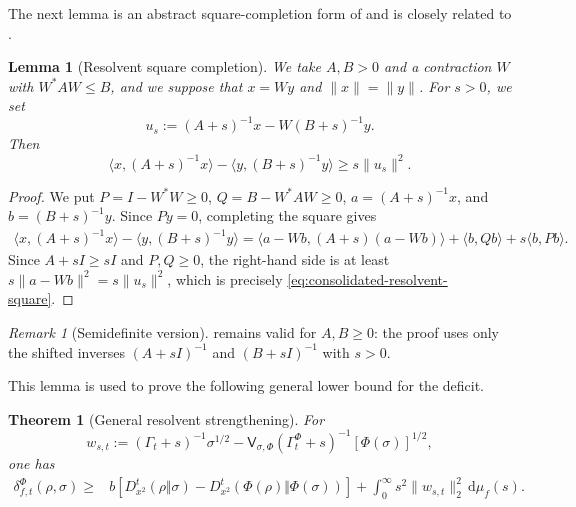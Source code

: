 \documentclass[11pt]{article}
\newtheorem{theorem}[theorem]{Theorem}
\newtheorem{lemma}[lemma]{Lemma}
\theoremstyle{remark}
\newtheorem{remark}[remark]{Remark}
\newcommand{\1}{\mathbbm{1}}
\begin{document}
The next lemma is an abstract square-completion form of
\cite[Lemma~2.1]{carlen2020recovery-map} and is closely related to
\cite[Lemma~5.1]{bluhm2020strengthened}.

\begin{lemma}[Resolvent square completion]
\label{lem:consolidated-resolvent}
We take $A,B>0$ and a contraction $W$ with $W^*AW\leq B$,
and we suppose that $x=Wy$ and
$\lVert x\rVert=\lVert y\rVert$.  For $s>0$, we set
\begin{equation}
 u_s:=(A+s)^{-1}x-W(B+s)^{-1}y.
\end{equation}
Then
\begin{equation}
 \langle x,(A+s)^{-1}x\rangle
 -\langle y,(B+s)^{-1}y\rangle
 \geq s\lVert u_s\rVert^2.
 \label{eq:consolidated-resolvent-square}
\end{equation}
\end{lemma}

\begin{proof}
We put $P=I-W^*W\geq0$, $Q=B-W^*AW\geq0$,
$a=(A+s)^{-1}x$, and $b=(B+s)^{-1}y$.  Since
$Py=0$, completing the square gives
\begin{align*}
 \langle x,(A+s)^{-1}x\rangle
 -\langle y,(B+s)^{-1}y\rangle=
 \langle a-Wb,(A+s)(a-Wb)\rangle
 +\langle b,Qb\rangle+s\langle b,Pb\rangle.
\end{align*}
Since $A+sI\geq sI$ and $P,Q\geq0$, the right-hand side is at least
$s\lVert a-Wb\rVert^2=s\lVert u_s\rVert^2$, which is precisely
\eqref{eq:consolidated-resolvent-square}.
\end{proof}

\begin{remark}[Semidefinite version]
 remains valid for $A,B\geq0$:
the proof uses only the shifted inverses $(A+sI)^{-1}$ and
$(B+sI)^{-1}$ with $s>0$.
\end{remark}

This lemma is used to prove the following general lower bound for the deficit. 

\begin{theorem}[General resolvent strengthening]
\label{thm:consolidated-resolvent-dpi}
For
\begin{equation}
 w_{s,t}:=(\Gamma_t+s)^{-1}\sigma^{1/2}
 -\mathsf V_{\sigma,\Phi}
  (\Gamma_t^\Phi+s)^{-1}[\Phi(\sigma)]^{1/2},
 \label{eq:consolidated-wst}
\end{equation}
one has
\begin{align}
 \delta_{f,t}^{\Phi}(\rho,\sigma)
 \geq{}&b\left[
 D_{x^2}^t(\rho\Vert\sigma)
 -D_{x^2}^t(\Phi(\rho)\Vert\Phi(\sigma))\right]
 +\int_0^\infty s^2\lVert w_{s,t}\rVert_2^2
 \,\mathrm d\mu_f(s).
 \label{eq:consolidated-general-remainder}
\end{align}
\end{theorem}
\end{document}
